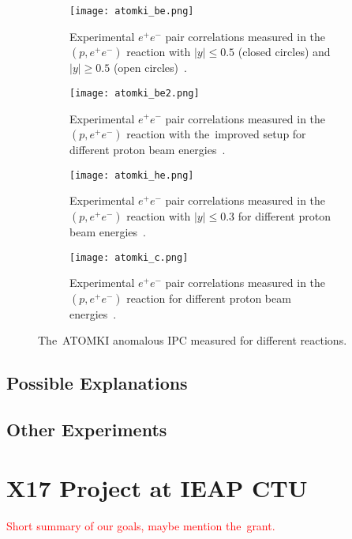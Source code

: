 				\begin{figure}[h]
					\centering
					\begin{subfigure}[t]{0.48\textwidth}
						\centering
						\texttt{[image: atomki\_be.png]}
						\caption{Experimental $e^+e^-$ pair correlations measured in the~$(p,e^+e^-)$ reaction with $|y| \leq 0.5$ (closed circles) and $|y| \geq 0.5$ (open circles)~\cite{atomki_be}.}
						\label{fig:atomki_be}
					\end{subfigure}
					\hfill
					\begin{subfigure}[t]{0.42\textwidth}
						\centering
						\texttt{[image: atomki\_be2.png]}
						\caption{Experimental $e^+e^-$ pair correlations measured in the~$(p,e^+e^-)$ reaction with the~improved setup for different proton beam energies~\cite{atomki_be2}.}
						\label{fig:atomki_be2}
					\end{subfigure}
					\begin{subfigure}[t]{0.45\textwidth}
						\centering
						\texttt{[image: atomki\_he.png]}
						\caption{Experimental $e^+e^-$ pair correlations measured in the~$(p,e^+e^-)$ reaction with $|y| \leq 0.3$ for different proton beam energies~\cite{atomki_he2}.}
						\label{fig:atomki_he}
					\end{subfigure}
					\hfill
					\begin{subfigure}[t]{0.45\textwidth}
						\centering
						\texttt{[image: atomki\_c.png]}
						\caption{Experimental $e^+e^-$ pair correlations measured in the~$(p,e^+e^-)$ reaction for different proton beam energies~\cite{atomki_c}.}
						\label{fig:atomki_c}
					\end{subfigure}
					\caption{The~ATOMKI anomalous \ac{IPC} measured for different reactions.}
					\label{fig:atomki}
				\end{figure}
		
		\subsection{Possible Explanations}
		
		\subsection{Other Experiments}
			
	
	\section{X17 Project at IEAP CTU}
	\label{sec:IEAP}
		\textcolor{red}{Short summary of our goals, maybe mention the~grant.}
